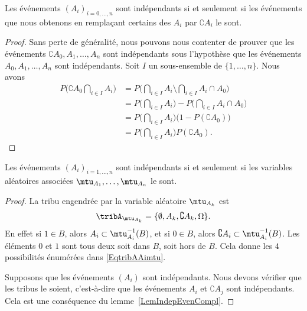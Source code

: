 \begin{lemma}       \label{LemIndepEvenCompl}
    Les événements \( (A_i)_{i=0,\ldots,n}\) sont indépendants si et seulement si les événements que nous obtenons en remplaçant certains des \( A_i\) par \( \complement A_i\) le sont.
\end{lemma}

\begin{proof}
    Sans perte de généralité, nous pouvons nous contenter de prouver que les événements \( \complement A_0,A_1,\ldots,A_n\) sont indépendants sous l'hypothèse que les événements \( A_0,A_1,\ldots,A_n\) sont indépendants. Soit \( I\) un sous-ensemble de \( \{ 1,\ldots,n \}\). Nous avons
    \begin{subequations}
        \begin{align}
            P\big( \complement A_0\bigcap_{i\in I}A_i \big)&=P\big( \bigcap_{i\in I}A_i\setminus\bigcap_{i\in I}A_i\cap A_0 \big)\\
            &=P\big( \bigcap_{i\in I}A_i \big)-P\big( \bigcap_{i\in I}A_i\cap A_0 \big)\\
            &=P\big( \bigcap_{i\in I}A_i \big)\big( 1-P(\complement A_0) \big)\\
            &=P\big( \bigcap_{i\in I}A_i \big)P(\complement A_0).
        \end{align}
    \end{subequations}
\end{proof}

\begin{proposition}
    Les événements \( (A_i)_{i=1,\ldots,n}\) sont indépendants si et seulement si les variables aléatoires associées \( \mtu_{A_1},\ldots,\mtu_{A_n}\) le sont.
\end{proposition}

\begin{proof}
    La tribu engendrée par la variable aléatoire \( \mtu_{A_k}\) est
    \begin{equation}    \label{EqtribAAimtu}
        \tribA_{\mtu_{A_k}}=\{ \emptyset,A_k,\complement A_k,\Omega \}.
    \end{equation}
    En effet si \( 1\in B\), alors \( A_i\subset\mtu_{A_i}^{-1}(B)\), et si \( 0\in B\), alors \( \complement A_i\subset\mtu_{A_i}^{-1}(B)\). Les éléments \( 0\) et \( 1\) sont tous deux soit dans \( B\), soit hors de \( B\). Cela donne les \( 4\) possibilités énumérées dans \eqref{EqtribAAimtu}.

    Supposons que les événements \( (A_i)\) sont indépendants. Nous devons vérifier que les tribus le soient, c'est-à-dire que les événements \( A_i\) et \( \complement A_j\) sont indépendants. Cela est une conséquence du lemme~\ref{LemIndepEvenCompl}.
\end{proof}

